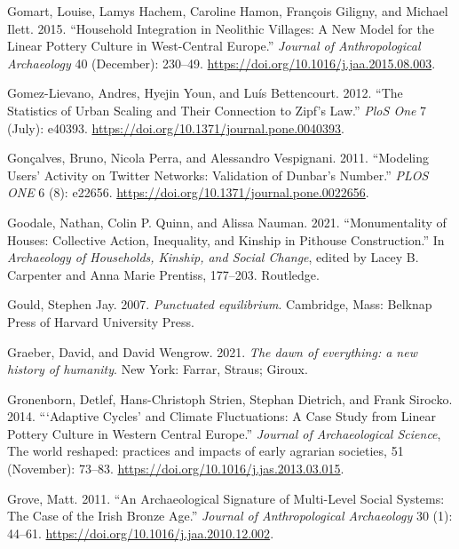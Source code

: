 \documentclass[
  12pt,
  a4paper, twoside]{book}
\newlength{\cslhangindent}
\newlength{\cslentryspacingunit} %
\newenvironment{CSLReferences}[2] %
 {%
  \setlength{\parindent}{0pt}
  \ifodd #1
  \let\oldpar\par
  \def\par{\hangindent=\cslhangindent\oldpar}
  \fi
  \setlength{\parskip}{#2\cslentryspacingunit}
 }%
 {}
\begin{document}
\begin{CSLReferences}{1}{0}
\leavevmode{}%
Gomart, Louise, Lamys Hachem, Caroline Hamon, François Giligny, and Michael Ilett. 2015. {``Household Integration in Neolithic Villages: A New Model for the Linear Pottery Culture in West-Central Europe.''} \emph{Journal of Anthropological Archaeology} 40 (December): 230--49. \url{https://doi.org/10.1016/j.jaa.2015.08.003}.

\leavevmode{}%
Gomez-Lievano, Andres, Hyejin Youn, and Luís Bettencourt. 2012. {``The Statistics of Urban Scaling and Their Connection to Zipf{'}s Law.''} \emph{PloS One} 7 (July): e40393. \url{https://doi.org/10.1371/journal.pone.0040393}.

\leavevmode{}%
Gonçalves, Bruno, Nicola Perra, and Alessandro Vespignani. 2011. {``Modeling Users' Activity on Twitter Networks: Validation of Dunbar's Number.''} \emph{PLOS ONE} 6 (8): e22656. \url{https://doi.org/10.1371/journal.pone.0022656}.

\leavevmode{}%
Goodale, Nathan, Colin P. Quinn, and Alissa Nauman. 2021. {``Monumentality of Houses: {Collective} Action, Inequality, and Kinship in Pithouse Construction.''} In \emph{Archaeology of {Households}, {Kinship}, and {Social Change}}, edited by Lacey B. Carpenter and Anna Marie Prentiss, 177--203. {Routledge}.

\leavevmode{}%
Gould, Stephen Jay. 2007. \emph{Punctuated equilibrium}. Cambridge, Mass: Belknap Press of Harvard University Press.

\leavevmode{}%
Graeber, David, and David Wengrow. 2021. \emph{The dawn of everything: a new history of humanity}. New York: Farrar, Straus; Giroux.

\leavevmode{}%
Gronenborn, Detlef, Hans-Christoph Strien, Stephan Dietrich, and Frank Sirocko. 2014. {``{`}Adaptive Cycles{'} and Climate Fluctuations: A Case Study from Linear Pottery Culture in Western Central Europe.''} \emph{Journal of Archaeological Science}, The world reshaped: practices and impacts of early agrarian societies, 51 (November): 73--83. \url{https://doi.org/10.1016/j.jas.2013.03.015}.

\leavevmode{}%
Grove, Matt. 2011. {``An Archaeological Signature of Multi-Level Social Systems: The Case of the Irish Bronze Age.''} \emph{Journal of Anthropological Archaeology} 30 (1): 44--61. \url{https://doi.org/10.1016/j.jaa.2010.12.002}.


\end{CSLReferences}
\end{document}
